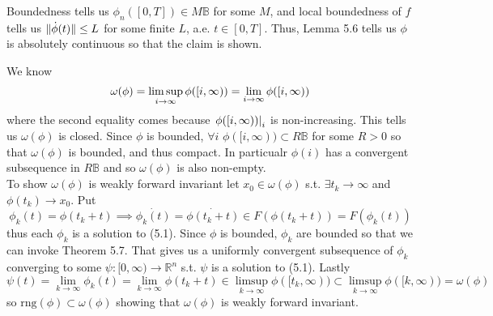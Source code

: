 \documentclass{article}
\newenvironment{ex}[1]
  {\renewcommand\theexercise{#1}\exercise}
  {\endexercise}
\newcommand{\B}{\mathbb{B}}
\newcommand{\R}[1]{\mathbb{R}^{#1}}
\begin{document}
\begin{ex}{5.14}
\begin{itemize}
      Boundedness tells us $\phi_n([0, T]) \in M \B$ for some $M$, and local boundedness of $f$ tells us $\lVert\dot{\phi}(t)\rVert \le L$ for some finite $L$, a.e. $t \in [0, T]$. Thus, Lemma 5.6 tells us $\phi$ is absolutely continuous so that the claim is shown.
  \end{itemize}
\end{ex} %
\begin{ex}{5.24} %
  We know
  $$
  \omega(\phi) = \limsup_{i \to \infty} \phi([i, \infty)) = \lim_{i \to \infty} \phi([i, \infty))
  $$
  where the second equality comes because $\left.\phi([i, \infty))\right|_i$ is non-increasing. This tells us $\omega(\phi)$ is closed. Since $\phi$ is bounded, $\forall i$ $\phi([i, \infty)) \subset R\B$ for some $R > 0$ so that $\omega(\phi)$ is bounded, and thus compact. In particualr $\phi(i)$ has a convergent subsequence in $R\B$ and so $\omega(\phi)$ is also non-empty. \, \\

  To show $\omega(\phi)$ is weakly forward invariant let $x_0 \in \omega(\phi)$ s.t. $\exists t_k \to \infty$ and $\phi(t_k) \to x_0$. Put
  $$
  \phi_k(t) = \phi(t_k + t) \implies \dot{\phi_k(t)} = \dot{\phi(t_k+t)} \in F(\phi(t_k+t)) = F(\phi_k(t))
  $$
  thus each $\phi_k$ is a solution to (5.1). Since $\phi$ is bounded, $\phi_k$ are bounded so that we can invoke Theorem 5.7. That gives us a uniformly convergent subsequence of $\phi_k$ converging to some $\psi : [0, \infty) \to \R{n}$ s.t. $\psi$ is a solution to (5.1). Lastly
  $$
  \psi(t) = \lim_{k \to \infty} \phi_k(t) = \lim_{k \to \infty} \phi(t_k + t) \in \limsup_{k \to \infty} \phi([t_k, \infty)) \subset \limsup_{k \to \infty} \phi([k, \infty)) = \omega(\phi)
  $$
  so $\mathrm{rng}(\phi) \subset \omega(\phi)$ showing that $\omega(\phi)$ is weakly forward invariant.
\end{ex} %
\end{document}
